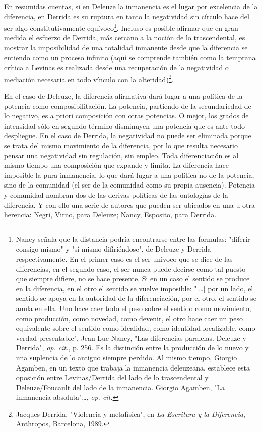 \documentclass{book}
\begin{document}
En resumidas cuentas, si en Deleuze la inmanencia es el lugar por
excelencia de la diferencia, en Derrida es su ruptura en tanto la
negatividad sin círculo hace del ser algo constitutivamente
equívoco\footnote{Nancy señala que la distancia podría encontrarse entre
  las formulas: "diferir consigo mismo" y "sí mismo difiriéndose", de
  Deleuze y Derrida respectivamente. En el primer caso es el ser univoco
  que se dice de las diferencias, en el segundo caso, el ser nunca puede
  decirse como tal puesto que siempre difiere, no se hace presente. Si
  en un caso el sentido se produce en la diferencia, en el otro el
  sentido se vuelve imposible: "{[}\ldots{]} por un lado, el sentido se
  apoya en la autoridad de la diferenciación, por el otro, el sentido se
  anula en ella. Uno hace caer todo el peso sobre el sentido como
  movimiento, como producción, como novedad, como devenir, el otro hace
  caer un peso equivalente sobre el sentido como idealidad, como
  identidad localizable, como verdad presentable", Jean-Luc Nancy, "Las
  diferencias paralelas. Deleuze y Derrida", \emph{op. cit.}, p. 256. Es
  la distinción entre la producción de lo nuevo y una suplencia de lo
  antiguo siempre perdido. Al mismo tiempo, Giorgio Agamben, en un texto
  que trabaja la inmanencia deleuzeana, establece esta oposición entre
  Levinas/Derrida del lado de lo trascendental y Deleuze/Foucault del
  lado de la inmanencia. Giorgio Agamben, "La inmanencia
  absoluta"\ldots, \emph{op. cit.}}. Incluso es posible afirmar que en
gran medida el esfuerzo de Derrida, más cercano a la noción de lo
trascendental, es mostrar la imposibilidad de una totalidad inmanente
desde que la diferencia se entiendo como un proceso infinito (aquí se
comprende también como la temprana crítica a Levinas es realizada desde
una recuperación de la negatividad o mediación necesaria en todo vínculo
con la alteridad)\footnote{Jacques Derrida, "Violencia y metafísica", en
  \emph{La Escritura y la Diferencia}, Anthropos, Barcelona, 1989.}.

En el caso de Deleuze, la diferencia afirmativa dará lugar a una
política de la potencia como composibilitación. La potencia, partiendo
de la secundariedad de lo negativo, es a priori composición con otras
potencias. O mejor, los grados de intensidad sólo en segundo término
disminuyen una potencia que es ante todo despliegue. En el caso de
Derrida, la negatividad no puede ser eliminada porque se trata del mismo
movimiento de la diferencia, por lo que resulta necesario pensar una
negatividad sin regulación, sin empleo. Toda diferenciación es al mismo
tiempo una composición que expande y limita. La diferencia hace
imposible la pura inmanencia, lo que dará lugar a una política no de la
potencia, sino de la comunidad (el ser de la comunidad como su propia
ausencia). Potencia y comunidad nombran dos de las derivas políticas de
las ontologías de la diferencia. Y con ello una serie de autores que
pueden ser ubicados en una u otra herencia: Negri, Virno, para Deleuze;
Nancy, Esposito, para Derrida.
\end{document}
